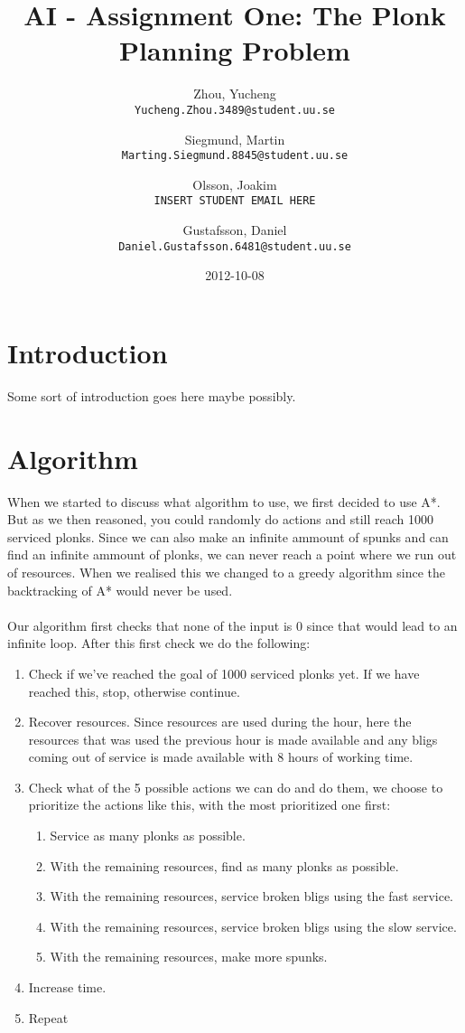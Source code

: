 \documentclass{article}
\begin{document}
\title{AI - Assignment One: The Plonk Planning Problem}
\date{2012-10-08}
\author{
	Zhou, Yucheng\\
	\texttt{Yucheng.Zhou.3489@student.uu.se}
	\and
	Siegmund, Martin\\
	\texttt{Marting.Siegmund.8845@student.uu.se}
	\and
	Olsson, Joakim\\
	\texttt{INSERT STUDENT EMAIL HERE}
	\and
	Gustafsson, Daniel\\
	\texttt{Daniel.Gustafsson.6481@student.uu.se}
}
\maketitle 

\section*{Introduction}
Some sort of introduction goes here maybe possibly.

\section*{Algorithm}
When we started to discuss what algorithm to use, we first decided to use A*. But as we then reasoned, you could randomly do actions and still reach 1000 serviced plonks. Since we can also make an infinite ammount of spunks and can find an infinite ammount of plonks, we can never reach a point where we run out of resources. When we realised this we changed to a greedy algorithm since the backtracking of A* would never be used.
\\ \\
Our algorithm first checks that none of the input is 0 since that would lead to an infinite loop. After this first check we do the following:
\begin{enumerate}
	\item Check if we've reached the goal of 1000 serviced plonks yet. If we have reached this, stop, otherwise continue.
	\item Recover resources. Since resources are used during the hour, here the resources that was used the previous hour is made available and any bligs coming out of service is made available with 8 hours of working time.
	\item Check what of the 5 possible actions we can do and do them, we choose to prioritize the actions like this, with the most prioritized one first:
	\begin{enumerate}
		\item Service as many plonks as possible.
		\item With the remaining resources, find as many plonks as possible.
		\item With the remaining resources, service broken bligs using the fast service.
		\item With the remaining resources, service broken bligs using the slow service.
		\item With the remaining resources, make more spunks.
	\end{enumerate}
	\item Increase time.
	\item Repeat
\end{enumerate}
\end{document}
